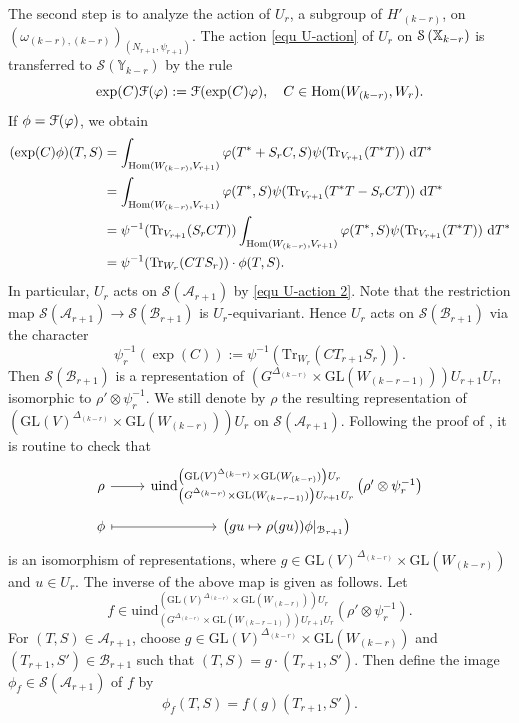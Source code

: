 \documentclass[11pt,reqno]{amsart}
\renewcommand{\1}{{\mathbf{1}}} \newcommand{\sB}{{\mathscr{B}}}
\newcommand{\BY}{{\mathbb {Y}}} \newcommand{\BZ}{{\mathbb {Z}}}
\newcommand{\CA}{{\mathcal {A}}} \newcommand{\CB}{{\mathcal {B}}}
\newcommand{\CS}{{\mathcal {S}}} \newcommand{\CT}{{\mathcal {T}}}
\newcommand{\GL}{{\mathrm{GL}}}\newcommand{\G}{{\mathrm{G}}}
\newcommand{\Tr}{{\mathrm{Tr}}}
\newcommand{\ra}{\rightarrow} \newcommand{\imp}{\Longrightarrow}
\theoremstyle{plain}
\theoremstyle{definition}
\numberwithin{equation}{section}
\begin{document}
The second step is to analyze the action of $U_r$,  a subgroup of $H'_{(k-r)}$, on  $\left(\omega_{(k-r),(k-r)}\right)_{(N_{r+1},\psi_{r+1})}$.
The action \eqref{equ U-action} of $U_r$ on $\CS\left(\BX_{k-r}\right)$ is transferred to $\CS\left(\BY_{k-r}\right)$ by the rule
$$\exp(C){\mathcal {F}}(\varphi):={\mathcal {F}}(\exp(C)\varphi),\quad C\in{\mathrm{Hom}}(W_{(k-r)},W_r).$$ If $\phi={\mathcal {F}}(\varphi)$, we obtain
\begin{equation}\label{equ U-action 2}
\begin{aligned}(\exp(C)\phi)(T,S)&=\int_{\Hom(W_{(k-r)},V_{r+1})}\varphi(T^*+S_rC,S)\psi(\Tr_{V_{r+1}}(T^*T))\ \d T^*\\
&=\int_{\Hom(W_{(k-r)},V_{r+1})}\varphi(T^*,S)\psi(\Tr_{V_{r+1}}(T^*T-S_rCT))\ \d T^*\\
&=\psi^{-1}(\Tr_{V_{r+1}}(S_rCT))\int_{\Hom(W_{(k-r)},V_{r+1})}\varphi(T^*,S)\psi(\Tr_{V_{r+1}}(T^*T))\ \d T^*\\
&=\psi^{-1}(\Tr_{W_r}(CTS_r))\cdot\phi(T,S).
\end{aligned}
\end{equation}
In particular, $U_r$ acts on $\CS(\CA_{r+1})$ by \eqref{equ U-action 2}.
Note that the restriction map
 $\CS(\CA_{r+1})\ra\CS(\CB_{r+1})$ is $U_r$-equivariant. Hence $U_r$ acts on $\CS(\CB_{r+1})$ via the character
$$\psi_r^{-1}(\exp(C)):=\psi^{-1}(\Tr_{W_r}(CT_{r+1}S_r)).$$ Then $\CS(\CB_{r+1})$ is a representation of $\left(G^{\Delta_{(k-r)}}\times\GL(W_{(k-r-1)})\right)U_{r+1}U_r$, isomorphic to $\rho'\otimes\psi_r^{-1}$.
We still denote by $\rho$ the resulting representation of $\left(\GL(V)^{\Delta_{(k-r)}}\times\GL(W_{(k-r)})\right)U_r$ on $\CS(\CA_{r+1})$. 
 Following the proof of \cite[Lemme 1.3]{min}, it is routine to check that
\begin{equation}\label{equ isom-pf3}\begin{tikzcd}[row sep=0.1cm]
	\rho & \mathrm{uind}_{\left(G^{\Delta_{(k-r)}}\times\GL(W_{(k-r-1)})\right)U_{r+1}U_r}^{\left(\GL(V)^{\Delta_{(k-r)}}\times\GL(W_{(k-r)})\right)U_r}\left(\rho'\otimes\psi_r^{-1}\right) \\
	\phi &  \left(gu\mapsto\rho(gu))\phi|_{\CB_{r+1}}\right)	\arrow[from=1-1, to=1-2]
	\arrow[maps to, from=2-1, to=2-2]
\end{tikzcd}\end{equation}
 is an isomorphism of representations, where $g\in \GL(V)^{\Delta_{(k-r)}}\times\GL(W_{(k-r)})$ and  $u\in U_r$. The inverse of the above map is given as follows. Let $$f\in \mathrm{uind}_{\left(G^{\Delta_{(k-r)}}\times\GL(W_{(k-r-1)})\right)U_{r+1}U_r}^{\left(\GL(V)^{\Delta_{(k-r)}}\times\GL(W_{(k-r)})\right)U_r}\left(\rho'\otimes\psi_r^{-1}\right).$$ For $(T,S)\in\CA_{r+1}$, choose $g\in\GL(V)^{\Delta_{(k-r)}}\times\GL(W_{(k-r)})$ and $(T_{r+1},S')\in\CB_{r+1}$ such that $(T,S)=g\cdot(T_{r+1},S')$. Then define the image $\phi_f\in\CS(\CA_{r+1})$ of $f$ by $$\phi_f(T,S)=f(g)(T_{r+1},S').$$
\end{document}
